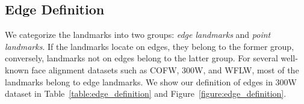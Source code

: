 \documentclass[10pt,twocolumn,letterpaper]{article}
\begin{document}
\begin{table*}[htbp]
\vspace{5mm}

\end{table*}

\subsection{Edge Definition}
We categorize the landmarks into two groups: \emph{edge landmarks} and \emph{point landmarks}. If the landmarks locate on edges, they belong to the former group, conversely, landmarks not on edges belong to the latter group. For several well-known face alignment datasets such as COFW, 300W, and WFLW, most of the landmarks belong to edge landmarks. 
We show our definition of edges in 300W dataset in Table~\ref{table:edge_definition} and Figure~\ref{figure:edge_definition}.
\end{document}
